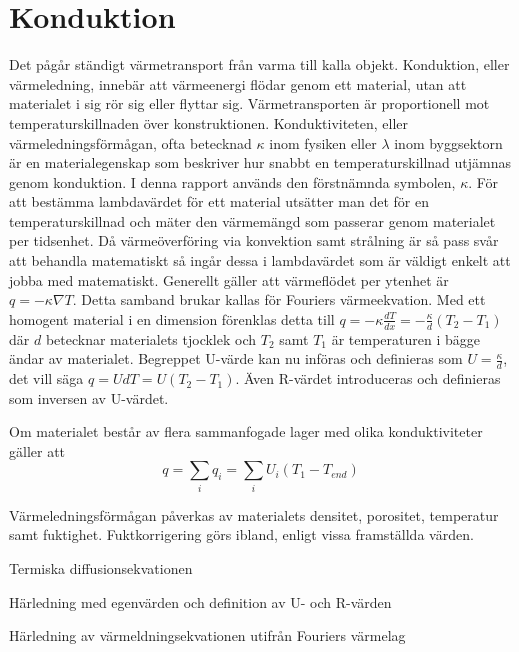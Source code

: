 \section{Konduktion}\label{sec:heatconduction}

Det pågår ständigt värmetransport från varma till kalla objekt. Konduktion, eller värmeledning, innebär att värmeenergi flödar genom ett material, utan att materialet i sig rör sig eller flyttar sig. Värmetransporten är proportionell mot temperaturskillnaden över konstruktionen. Konduktiviteten, eller värmeledningsförmågan, ofta betecknad $\kappa$ inom fysiken eller $\lambda$ inom byggsektorn är en materialegenskap som beskriver hur snabbt en temperaturskillnad utjämnas genom konduktion. I denna rapport används den förstnämnda symbolen, $\kappa$. För att bestämma lambdavärdet för ett material utsätter man det för en temperaturskillnad och mäter den värmemängd som passerar genom materialet per tidsenhet. Då värmeöverföring via konvektion samt strålning är så pass svår att behandla matematiskt så ingår dessa i lambdavärdet som är väldigt enkelt att jobba med matematiskt. Generellt gäller att värmeflödet per ytenhet är $q = - \kappa \nabla T$. Detta samband brukar kallas för Fouriers värmeekvation. Med ett homogent material i en dimension förenklas detta till $q = -\kappa \frac{dT}{dx} = -\frac{\kappa}{d}\left( T_2-T_1\right)$ där $d$ betecknar materialets tjocklek och $T_2$ samt $T_1$ är temperaturen i bägge ändar av materialet. Begreppet U-värde kan nu införas och definieras som $U = \frac{\kappa}{d}$, det vill säga $q = UdT = U\left( T_2-T_1 \right)$. Även R-värdet introduceras och definieras som inversen av U-värdet.

Om materialet består av flera sammanfogade lager med olika konduktiviteter gäller att
\begin{equation}
q = \sum_i q_i = \sum_i U_i \left( T_{1} - T_{end}\right)
\end{equation} 

Värmeledningsförmågan påverkas av materialets densitet, porositet, temperatur samt fuktighet. Fuktkorrigering görs ibland, enligt vissa framställda värden.

Termiska diffusionsekvationen

Härledning med egenvärden och definition av U- och R-värden

Härledning av värmeldningsekvationen utifrån Fouriers värmelag
